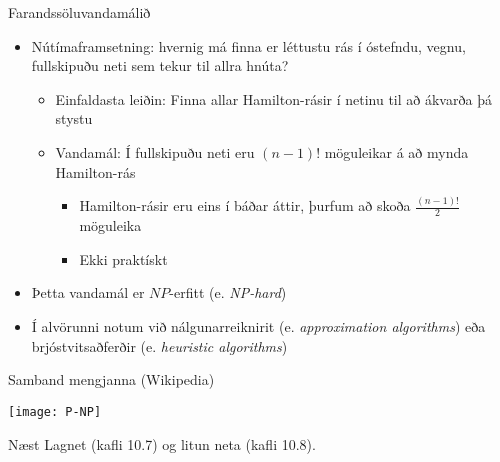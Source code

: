 \documentclass[handout]{beamer}
\begin{document}
\begin{frame}{Farandssöluvandamálið}
\begin{itemize}
 \item Nútímaframsetning: hvernig má finna er léttustu rás í óstefndu, vegnu, fullskipuðu neti sem tekur til allra hnúta? \pause
 \begin{itemize}
  \item Einfaldasta leiðin: Finna allar Hamilton-rásir í netinu til að ákvarða þá stystu
  \item Vandamál: Í fullskipuðu neti eru $(n-1)!$ möguleikar á að mynda Hamilton-rás
  \begin{itemize}
   \item Hamilton-rásir eru eins í báðar áttir, þurfum að skoða $\frac{(n-1)!}{2}$ möguleika
   \item Ekki praktískt
  \end{itemize}
 \end{itemize}
 \item Þetta vandamál er $NP$-erfitt (e. \emph{NP-hard})
 \item Í alvörunni notum við nálgunarreiknirit (e. \emph{approximation algorithms}) eða brjóstvitsaðferðir (e. \emph{heuristic algorithms})
\end{itemize}
\end{frame}

\begin{frame}{Samband mengjanna (Wikipedia)}
    \begin{center}
    \texttt{[image: P-NP]}
    \end{center}
\end{frame}


\begin{frame}{Næst}
Lagnet (kafli 10.7) og litun neta (kafli 10.8).
\end{frame}
\end{document}
